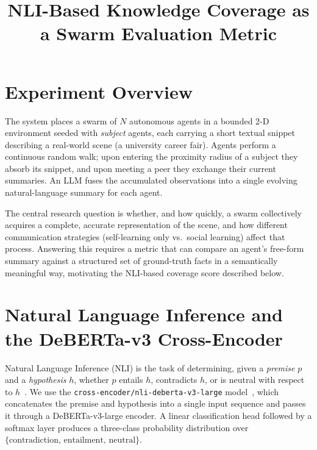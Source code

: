 \documentclass[10pt,twocolumn]{article}
\title{\textbf{NLI-Based Knowledge Coverage as a Swarm Evaluation Metric}}
\author{}
\date{}
\begin{document}
\maketitle
\vspace{-1.5em}



\section{Experiment Overview}

The system places a swarm of $N$ autonomous agents in a bounded 2-D
environment seeded with \emph{subject} agents, each carrying a short
textual snippet describing a real-world scene (a university career fair).
Agents perform a continuous random walk; upon entering the proximity radius
of a subject they absorb its snippet, and upon meeting a peer they exchange
their current summaries. An LLM fuses the accumulated observations into a
single evolving natural-language summary for each agent.

The central research question is whether, and how quickly, a swarm
collectively acquires a complete, accurate representation of the scene,
and how different communication strategies (self-learning only vs.\
social learning) affect that process. Answering this requires a metric
that can compare an agent's free-form summary against a structured set of
ground-truth facts in a semantically meaningful way, motivating the
NLI-based coverage score described below.

\section{Natural Language Inference and the DeBERTa-v3 Cross-Encoder}

Natural Language Inference (NLI) is the task of determining, given a
\emph{premise} $p$ and a \emph{hypothesis} $h$, whether $p$ entails $h$,
contradicts $h$, or is neutral with respect to $h$~\cite{bowman2015snli}.
We use the \texttt{cross\nobreakdash-encoder/nli\nobreakdash-deberta\nobreakdash-v3\nobreakdash-large}
model~\cite{he2021debertav3}, which concatenates the premise and hypothesis
into a single input sequence and passes it through a DeBERTa-v3-large
encoder. A linear classification head followed by a softmax layer produces
a three-class probability distribution over
$\{\text{contradiction},\,\text{entailment},\,\text{neutral}\}$.
\end{document}
